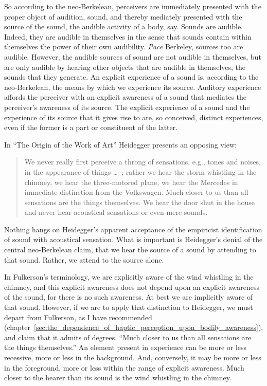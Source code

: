 So according to the neo-Berkelean, perceivers are immediately presented with the proper object of audition, sound, and thereby mediately presented with the source of the sound, the audible activity of a body, say. Sounds are audible. Indeed, they are audible in themselves in the sense that sounds contain within themselves the power of their own audibility. \emph{Pace} Berkeley, sources too are audible. However, the audible sources of sound are not audible in themselves, but are only audible by hearing other objects that are audible in themselves, the sounds that they generate. An explicit experience of a sound is, according to the neo-Berkelean, the means by which we experience its source.  Auditory experience affords the perceiver with an explicit awareness of a sound that mediates the perceiver's awareness of its source. The explicit experience of a sound and the experience of its source that it gives rise to are, so conceived, distinct experiences, even if the former is a part or constituent of the latter.

In ``The Origin of the Work of Art'' Heidegger presents an opposing view:
\begin{quote}
    We never really first perceive a throng of sensations, e.g., tones and noises, in the appearance of things \ldots\ ; rather we hear the storm whistling in the chimney, we hear the three-motored plane, we hear the Mercedes in immediate distinction from the Volkswagen. Much closer to us than all sensations are the things themselves. We hear the door shut in the house and never hear acoustical sensations or even mere sounds. \citep[151--152]{Heidegger:1935uq}
\end{quote}
Nothing hangs on Heidegger's apparent acceptance of the empiricist identification of sound with acoustical sensation. What is important is Heidegger's denial of the central neo-Berkelean claim, that we hear the source of a sound by attending to that sound. Rather, we attend to the source alone. 

In Fulkerson's \citeyearpar{Fulkerson:2014ek} terminology, we are explicitly aware of the wind whistling in the chimney, and this explicit awareness does not depend upon an explicit awareness of the sound, for there is no such awareness. At best we are implicitly aware of that sound. However, if we are to apply that distinction to Heidegger, we must depart from Fulkerson, as I have recommended (chapter~\ref{sec:the_dependence_of_haptic_perception_upon_bodily_awareness}), and claim that it admits of degrees. ``Much closer to us than all sensations are the things themselves.'' An element present in experience can be more or less recessive, more or less in the background. And, conversely, it may be more or less in the foreground, more or less within the range of explicit awareness. Much closer to the hearer than its sound is the wind whistling in the chimney.

